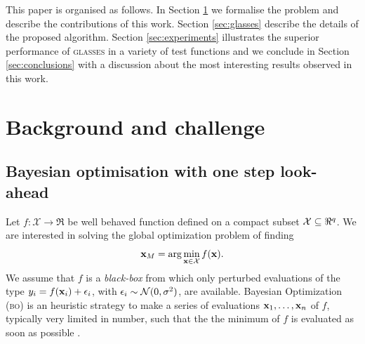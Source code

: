 \documentclass[twoside]{article}
\newcommand{\acr}[1]{\textsc{#1}\xspace}
\newcommand{\us}{\acr{glasses}}
\newcommand{\bo}{\acr{bo}}
\begin{document}

This paper is organised as follows. In Section \ref{sec:background} we formalise the problem and describe the contributions of this work. Section \ref{sec:glasses} describe the details of the proposed algorithm. Section \ref{sec:experiments} illustrates the superior performance of \us in a variety of test functions and we conclude in Section \ref{sec:conclusions} with a discussion about the most interesting results observed in this work.


\section{Background and challenge}\label{sec:background}
\subsection{Bayesian optimisation with one step look-ahead} %
\label{sec:bayesian_optimisation}



Let $f: {\mathcal X} \to \Re$ be well behaved function defined on a compact subset ${\mathcal X} \subseteq \Re^{q}$. We are interested in solving the global optimization problem of finding 
$$\mathbf{x}_{M} = \arg \min_{\mathbf{x} \in {\mathcal X}} f(\mathbf{x}).$$ 
We assume that $f$ is a \emph{black-box} from which only perturbed evaluations of the type $y_i = f(\mathbf{x}_i) + \epsilon_i$, with $\epsilon_i \sim\mathcal{N}(0,\sigma^2)$, are  available. Bayesian Optimization (\bo) is an heuristic strategy to make a series of evaluations $\mathbf{x}_1,\dots,\mathbf{x}_n$ of $f$, typically very limited in number,  such that the the minimum of $f$ is evaluated as soon as possible \citep{Lizotte_2008,Jones_2001,Snoek*Larochelle*Adams_2012,Brochu*Cora*DeFreitas_2010}.
\end{document}
